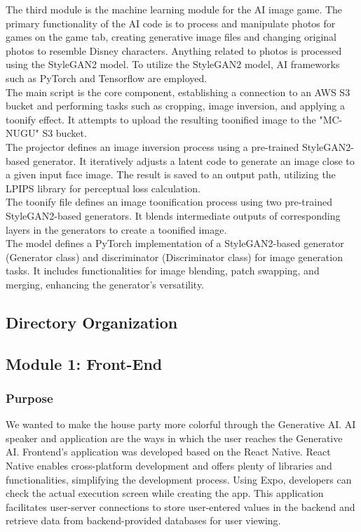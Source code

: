 \documentclass[conference]{IEEEtran}
\begin{document}
            The third module is the machine learning module for the AI image game. The primary functionality of the AI code is to process and manipulate photos for games on the game tab, creating generative image files and changing original photos to resemble Disney characters. Anything related to photos is processed using the StyleGAN2 model. To utilize the StyleGAN2 model, AI frameworks such as PyTorch and Tensorflow are employed.\\
            The main script is the core component, establishing a connection to an AWS S3 bucket and performing tasks such as cropping, image inversion, and applying a toonify effect. It attempts to upload the resulting toonified image to the "MC-NUGU" S3 bucket.\\
            The projector defines an image inversion process using a pre-trained StyleGAN2-based generator. It iteratively adjusts a latent code to generate an image close to a given input face image. The result is saved to an output path, utilizing the LPIPS library for perceptual loss calculation.\\
            The toonify file defines an image toonification process using two pre-trained StyleGAN2-based generators. It blends intermediate outputs of corresponding layers in the generators to create a toonified image.\\
            The model defines a PyTorch implementation of a StyleGAN2-based generator (Generator class) and discriminator (Discriminator class) for image generation tasks. It includes functionalities for image blending, patch swapping, and merging, enhancing the generator's versatility.\\

            
    \subsection{Directory Organization}
    \subsection{Module 1: Front-End}
        \subsubsection{Purpose}
            We wanted to make the house party more colorful through the Generative AI. AI speaker and application are the ways in which the user reaches the Generative AI. Frontend's application was developed based on the React Native. React Native enables cross-platform development and offers plenty of libraries and functionalities, simplifying the development process. Using Expo, developers can check the actual execution screen while creating the app. This application facilitates user-server connections to store user-entered values in the backend and retrieve data from backend-provided databases for user viewing.\\
\end{document}
